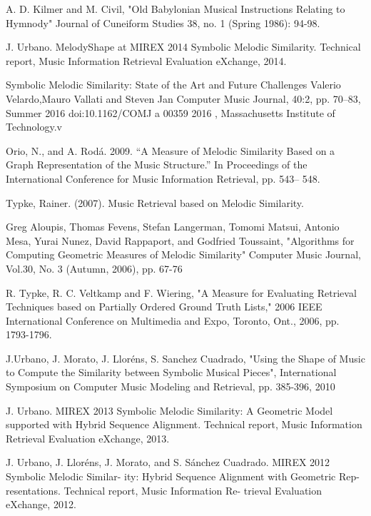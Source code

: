 \documentclass{llncs}
\begin{document}
	\begin{thebibliography}{7}
	
	A. D. Kilmer and M. Civil, 
	"Old Babylonian Musical Instructions Relating to Hymnody" 
	Journal of Cuneiform Studies 38, 
	no. 1 (Spring 1986): 94-98.

	J. Urbano. MelodyShape at 
	MIREX 2014 Symbolic Melodic Similarity. 
	Technical report, Music Information Retrieval Evaluation eXchange, 2014.

	Symbolic Melodic Similarity: State of the Art and Future Challenges
	Valerio Velardo,Mauro Vallati and Steven Jan
	Computer Music Journal, 40:2, pp. 70–83, Summer 2016 doi:10.1162/COMJ a 00359
	2016 , Massachusetts Institute of Technology.v

	 Orio, N., and A. Rodá. 2009. “A Measure of Melodic Similarity Based on a Graph Representation of the Music Structure.” In Proceedings of the International Conference for Music Information Retrieval, pp. 543– 548.

	 Typke, Rainer. (2007). Music Retrieval based on Melodic Similarity.

	 Greg Aloupis, Thomas Fevens, Stefan Langerman, Tomomi Matsui, Antonio Mesa, Yurai Nunez, David Rappaport, and Godfried Toussaint, "Algorithms for Computing Geometric Measures of Melodic Similarity" Computer Music Journal, Vol.30, No. 3 (Autumn, 2006), pp. 67-76

	 R. Typke, R. C. Veltkamp and F. Wiering, "A Measure for Evaluating Retrieval Techniques based on Partially Ordered Ground Truth Lists," 2006 IEEE International Conference on Multimedia and Expo, Toronto, Ont., 2006, pp. 1793-1796.
	
	 J.Urbano, J. Morato, J. Lloréns, S. Sanchez Cuadrado, "Using the Shape of Music to Compute the Similarity between Symbolic Musical Pieces", International Symposium on Computer Music Modeling and Retrieval, pp. 385-396, 2010
	
	 J. Urbano. MIREX 2013 Symbolic Melodic Similarity:
A Geometric Model supported with Hybrid Sequence
Alignment. Technical report, Music Information Retrieval Evaluation eXchange, 2013.

  J. Urbano, J. Lloréns, J. Morato, and S. Sánchez 
Cuadrado. MIREX 2012 Symbolic Melodic Similar-
ity: Hybrid Sequence Alignment with Geometric Rep-
resentations. Technical report, Music Information Re-
trieval Evaluation eXchange, 2012.
	

	\end{thebibliography}

	
\end{document}
